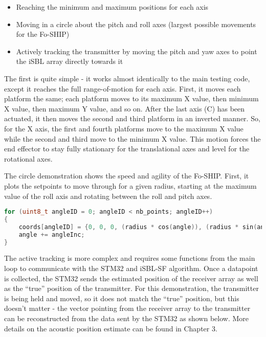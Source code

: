 \documentclass[12pt,a4paper]{report}
\begin{document}
\begin{itemize}[noitemsep,topsep=0pt]
	\item Reaching the minimum and maximum positions for each axis
	\item Moving in a circle about the pitch and roll axes (largest possible movements for the Fo-SHIP)
	\item Actively tracking the transmitter by moving the pitch and yaw axes to point the iSBL array directly towards it
\end{itemize}

The first is quite simple - it works almost identically to the main testing code, except it reaches the full range-of-motion for each axis. First, it moves each platform the same; each platform moves to its maximum X value, then minimum X value, then maximum Y value, and so on. After the last axis (C) has been actuated, it then moves the second and third platform in an inverted manner. So, for the X axis, the first and fourth platforms move to the maximum X value while the second and third move to the minimum X value. This motion forces the end effector to stay fully stationary for the translational axes and level for the rotational axes.

The circle demonstration shows the speed and agility of the Fo-SHIP. First, it plots the setpoints to move through for a given radius, starting at the maximum value of the roll axis and rotating between the roll and pitch axes.

\begin{lstlisting}[language=C++]
for (uint8_t angleID = 0; angleID < nb_points; angleID++)
{
	coords[angleID] = {0, 0, 0, (radius * cos(angle)), (radius * sin(angle)), 0};
	angle += angleInc;
}
\end{lstlisting}

The active tracking is more complex and requires some functions from the main loop to communicate with the STM32 and iSBL-SF algorithm. Once a datapoint is collected, the STM32 sends the estimated position of the receiver array as well as the “true” position of the transmitter. For this demonstration, the transmitter is being held and moved, so it does not match the “true” position, but this doesn’t matter - the vector pointing from the receiver array to the transmitter can be reconstructed from the data sent by the STM32 as shown below. More details on the acoustic position estimate can be found in Chapter 3.
\end{document}
